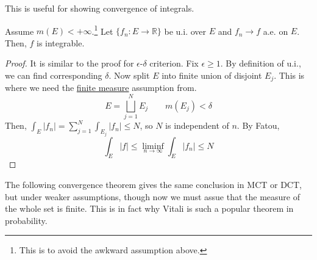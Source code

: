   This is useful for showing convergence of integrals. 

  \begin{lemma}
    \label{thm:limit-of-u-i-functions-is-integrable}
    Assume $m(E) < +\infty$.\footnote{This is to avoid the awkward assumption above.} Let $\{f_n: E \to \mathbb{R}\}$ be u.i. over $E$ and $f_n \to f$ a.e. on $E$. Then, $f$ is integrable. 
  \end{lemma}
  \begin{proof}
    It is similar to the proof for $\epsilon$-$\delta$ criterion. Fix $\epsilon \geq 1$. By definition of u.i., we can find corresponding $\delta$. Now split $E$ into finite union of disjoint $E_j$. This is where we need the \hyperref[def:finite-measure]{finite measure} assumption from. 
    \begin{equation}
      E = \bigsqcup_{j=1}^N E_j \qquad m(E_j) < \delta
    \end{equation}
    Then, $\int_E |f_n| = \sum_{j=1}^N \int_{E_j} |f_n| \leq N$, so $N$ is independent of $n$. By Fatou, 
    \begin{equation}
      \int_E |f| \leq \liminf_{n \to \infty} \int_E |f_n| \leq N
    \end{equation}
  \end{proof}

  The following convergence theorem gives the same conclusion in MCT or DCT, but under weaker assumptions, though now we must assue that the measure of the whole set is finite. This is in fact why Vitali is such a popular theorem in probability. 


